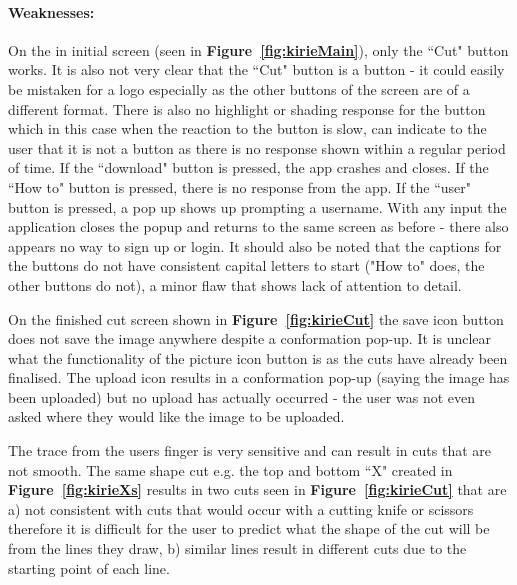 \documentclass[11pt]{article}
\begin{document}
                
                \paragraph{Weaknesses:}
                On the in initial screen (seen in \textbf{Figure~\ref{fig:kirieMain}}), only the ``Cut" button works. It is also not very clear that the ``Cut" button is a button - it could easily be  mistaken for a logo especially as the other buttons of the screen are of a different format. There is also no highlight or shading response for the button which in this case when the reaction to the button is slow, can indicate to the user that it is not a button as there is no response shown within a regular period of time. If the ``download" button is pressed, the app crashes and closes. If the ``How to" button is pressed, there is no response from the app. If the ``user" button is pressed, a pop up shows up prompting a username. With any input the application closes the popup and returns to the same screen as before - there also appears no way to sign up or login. It should also be noted that the captions for the buttons do not have consistent capital letters to start ("How to" does, the other buttons do not), a minor flaw that shows lack of attention to detail.
                
                On the finished cut screen shown in \textbf{Figure~\ref{fig:kirieCut}} the save icon button does not save the image anywhere despite a conformation pop-up. It is unclear what the functionality of the picture icon button is as the cuts have already been finalised. The upload icon results in a conformation pop-up (saying the image has been uploaded) but no upload has actually occurred - the user was not even asked where they would like the image to be uploaded. 
                
                The trace from the users finger is very sensitive and can result in cuts that are not smooth. The same shape cut e.g. the top and bottom ``X" created in \textbf{Figure~\ref{fig:kirieXs}} results in two cuts seen in \textbf{Figure~\ref{fig:kirieCut}} that are a) not consistent with cuts that would occur with a cutting knife or scissors therefore it is difficult for the user to predict what the shape of the cut will be from the lines they draw, b) similar lines result in different cuts due to the starting point of each line.
                
\end{document}
